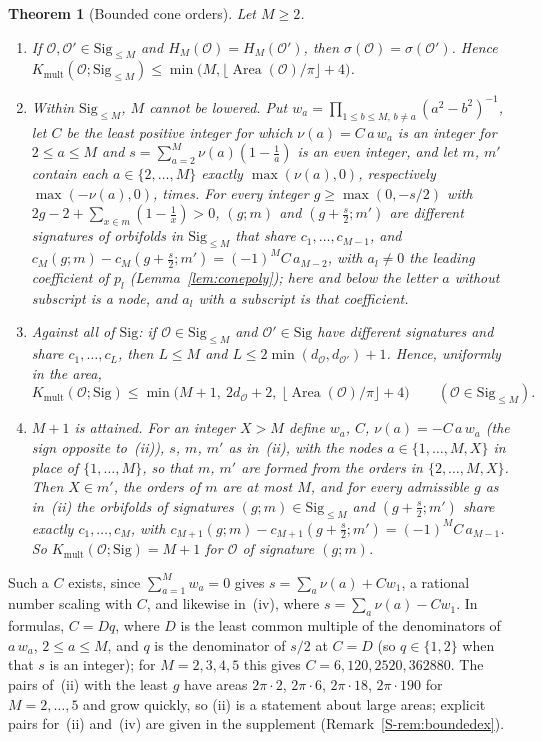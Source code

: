 \documentclass[pdflatex,sn-mathphys-num]{sn-jnl}
\theoremstyle{thmstyleone}%
\newtheorem{theorem}{Theorem}[section]%
\theoremstyle{thmstylethree}%
\newcommand{\Orb}{\mathcal{O}}
\newcommand{\Sig}{\mathrm{Sig}}
\newcommand{\Kmult}{K_{\mathrm{mult}}}
\newcommand{\Area}{\operatorname{Area}}
\newcommand{\sref}[1]{\ref*{S-#1}}%
\begin{document}
\begin{theorem}[Bounded cone orders]\label{thm:bounded}
Let $M\ge2$.
\begin{enumerate}[label=(\roman*)]
\item If $\Orb,\Orb'\in\Sig_{\le M}$ and $H_M(\Orb)=H_M(\Orb')$, then $\sigma(\Orb)=\sigma(\Orb')$. Hence $\Kmult(\Orb;\Sig_{\le M})\le\min\big(M,\lfloor\Area(\Orb)/\pi\rfloor+4\big)$.
\item Within $\Sig_{\le M}$, $M$ cannot be lowered. Put $w_a=\prod_{1\le b\le M,\,b\ne a}(a^2-b^2)^{-1}$, let $C$ be the least positive integer for which $\nu(a)=C\,a\,w_a$ is an integer for $2\le a\le M$ and $s=\sum_{a=2}^M\nu(a)(1-\frac1a)$ is an even integer, and let $m$, $m'$ contain each $a\in\{2,\dots,M\}$ exactly $\max(\nu(a),0)$, respectively $\max(-\nu(a),0)$, times. For every integer $g\ge\max(0,-s/2)$ with $2g-2+\sum_{x\in m}(1-\frac1x)>0$, $(g;m)$ and $(g+\frac s2;m')$ are different signatures of orbifolds in $\Sig_{\le M}$ that share $c_1,\dots,c_{M-1}$, and $c_M(g;m)-c_M(g+\frac s2;m')=(-1)^MC\,a_{M-2}$, with $a_l\ne0$ the leading coefficient of $p_l$ (Lemma~\ref{lem:conepoly}); here and below the letter $a$ without subscript is a node, and $a_l$ with a subscript is that coefficient.
\item Against all of $\Sig$: if $\Orb\in\Sig_{\le M}$ and $\Orb'\in\Sig$ have different signatures and share $c_1,\dots,c_L$, then $L\le M$ and $L\le2\min(d_\Orb,d_{\Orb'})+1$. Hence, uniformly in the area,
\[
  \Kmult(\Orb;\Sig)\le\min\big(M+1,\ 2d_\Orb+2,\ \lfloor\Area(\Orb)/\pi\rfloor+4\big)\qquad(\Orb\in\Sig_{\le M}).
\]
\item $M+1$ is attained. For an integer $X>M$ define $w_a$, $C$, $\nu(a)=-C\,a\,w_a$ (the sign opposite to~(ii)), $s$, $m$, $m'$ as in~(ii), with the nodes $a\in\{1,\dots,M,X\}$ in place of $\{1,\dots,M\}$, so that $m$, $m'$ are formed from the orders in $\{2,\dots,M,X\}$. Then $X\in m'$, the orders of $m$ are at most $M$, and for every admissible $g$ as in~(ii) the orbifolds of signatures $(g;m)\in\Sig_{\le M}$ and $(g+\frac s2;m')$ share exactly $c_1,\dots,c_M$, with $c_{M+1}(g;m)-c_{M+1}(g+\frac s2;m')=(-1)^MC\,a_{M-1}$. So $\Kmult(\Orb;\Sig)=M+1$ for $\Orb$ of signature $(g;m)$.
\end{enumerate}
\end{theorem}

Such a $C$ exists, since $\sum_{a=1}^Mw_a=0$ gives $s=\sum_a\nu(a)+Cw_1$, a rational number scaling with $C$, and likewise in~(iv), where $s=\sum_a\nu(a)-Cw_1$. In formulas, $C=Dq$, where $D$ is the least common multiple of the denominators of $a\,w_a$, $2\le a\le M$, and $q$ is the denominator of $s/2$ at $C=D$ (so $q\in\{1,2\}$ when that $s$ is an integer); for $M=2,3,4,5$ this gives $C=6,120,2520,362880$. The pairs of~(ii) with the least $g$ have areas $2\pi\cdot2$, $2\pi\cdot6$, $2\pi\cdot18$, $2\pi\cdot190$ for $M=2,\dots,5$ and grow quickly, so (ii) is a statement about large areas; explicit pairs for~(ii) and~(iv) are given in the supplement (Remark~\sref{rem:boundedex}).
\end{document}
